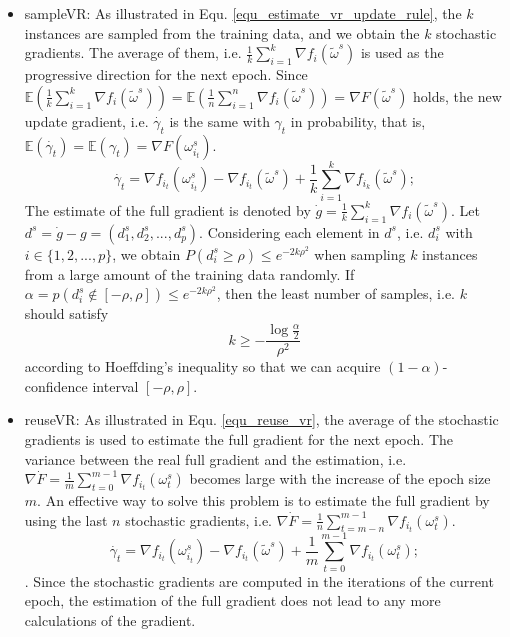 \documentclass[letterpaper]{article}
\begin{document}
\begin {itemize}
\item{sampleVR:} As illustrated in Equ. \ref{equ_estimate_vr_update_rule}, the $k$ instances are sampled from the training data, and we obtain the $k$ stochastic gradients. The average of them, i.e. $\frac{1}{k}\sum\limits_{i=1}^k\nabla f_i(\tilde{\omega}^s)$ is used as the progressive direction for the next epoch. Since $\mathbb{E} \left(  \frac{1}{k}\sum\limits_{i=1}^k\nabla f_i(\tilde{\omega}^s) \right)=  \mathbb{E} \left (\frac{1}{n}\sum\limits_{i=1}^n\nabla f_i(\tilde{\omega}^s) \right)  =  \nabla F(\tilde{\omega}^s)$ holds, the new update gradient, i.e. $\dot{\gamma_t}$ is the same with $\gamma_t$ in probability, that is, $\mathbb{E} (  \dot{\gamma_t}) = \mathbb{E} (\gamma_t) = \nabla F(\omega_{i_t}^s)$. 
\begin{equation}
\label{equ_estimate_vr_update_rule}
\dot{\gamma_t}=\nabla f_{i_t}(\omega_{i_t}^s)-\nabla f_{i_t}(\tilde{\omega}^s)+\frac{1}{k}\sum\limits_{i=1}^k\nabla f_{i_k}(\tilde{\omega}^s);
\end{equation}
The estimate of the full gradient is denoted by $\dot{g} = \frac{1}{k}\sum\limits_{i=1}^k\nabla f_i(\tilde{\omega}^s)$. Let $d^s = \dot{g}-g=(d_1^s, d_2^s, ..., d_p^s)$. Considering each element in $d^s$, i.e. $d_i^s$ with $i\in\{ 1,2, ..., p  \}$, we obtain $P(d_i^s \ge \rho) \le e^{-2k\rho^2}$ when sampling $k$ instances from a large amount of the training data randomly. If $\alpha = p (d_i^s\notin [-\rho, \rho] ) \le e^{-2k\rho^2}$, then the least number of samples, i.e. $k$ should satisfy
\begin{equation}
\label{equ_estimate_samples_lower_bound}
k\ge - \frac{\log \frac{\alpha}{2}}{\rho^2}
\end{equation} according to Hoeffding's inequality so that we can acquire $(1-\alpha)$-confidence interval $[-\rho, \rho]$.

\item{reuseVR:} As illustrated in Equ. \ref{equ_reuse_vr}, the average of the stochastic gradients is used to estimate the full gradient for the next epoch. The variance between the real full gradient and the estimation, i.e. $\nabla \dot{F} =\frac{1}{m}\sum\limits_{t=0}^{m-1} \nabla f_{i_t}(\omega_{t}^s)$ becomes large with the increase of the epoch size $m$. An effective way to solve this problem is to estimate the full gradient by using the last $n$ stochastic gradients, i.e. $\nabla \dot{F} = \frac{1}{n}\sum\limits_{t=m-n}^{m-1} \nabla f_{i_t}(\omega_{t}^s)$. 
\begin{equation}
\label{equ_reuse_vr}
\dot{\gamma_t}=\nabla f_{i_t}(\omega_{i_t}^s)-\nabla f_{i_t}(\tilde{\omega}^s)+\frac{1}{m}\sum\limits_{t=0}^{m-1} \nabla f_{i_t}(\omega_{t}^s);
\end{equation}. Since the stochastic gradients are computed in the iterations of the current epoch, the estimation of the full gradient does not lead to any more calculations of the gradient.
\end{itemize}
\end{document}
